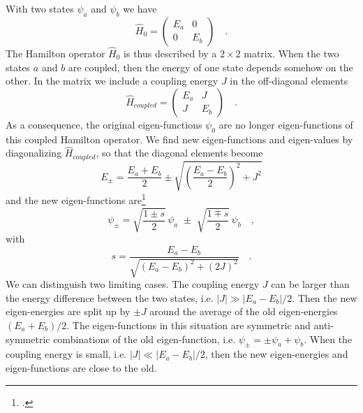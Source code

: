 With two states $\psi_a$ and $\psi_b$ we have
\begin{equation}
\hat{H}_0  = \begin{pmatrix}  E_a & 0 \\ 0 & E_b \end{pmatrix} 
	  \quad .
\end{equation}
The Hamilton operator $\hat{H}_0$ is thus described by a $2 \times 2$ matrix. When the two states $a$ and $b$ are coupled, then the energy of one state depends somehow on the other. In the matrix we include a coupling energy $J$ in the off-diagonal elements
\begin{equation}
\hat{H}_{coupled}  = \begin{pmatrix}  E_a & J \\ J & E_b \end{pmatrix} 
\quad . 
\end{equation}
As a consequence, the original eigen-functions $\psi_0$ are no longer eigen-functions of this coupled Hamilton operator. We find new eigen-functions and eigen-values by diagonalizing $\hat{H}_{coupled}$, so that the diagonal elements become
\begin{equation}
 E_\pm = \frac{E_a + E_b}{2} \pm \sqrt{ \left( \frac{E_a - E_b}{2} \right)^2 + J^2 }
\end{equation}
and the new  eigen-functions are\footcite[eq. 8.10]{Parson}
\begin{equation}
 \psi_{\pm} = 
\sqrt{\frac{1 \pm s}{2}} \,  \psi_a \, \,  \pm \, \, \sqrt{\frac{1 \mp s}{2}}  \, \psi_b \quad ,
\end{equation}
with
\begin{equation}
s = \frac{E_a - E_b}{\sqrt{(E_a - E_b)^2 + (2J)^2}} \quad .
\end{equation}
%
We can distinguish two limiting cases. The coupling energy $J$ can be larger than the energy difference between the two states, i.e. $|J| \gg |E_a - E_b| / 2$. Then the new eigen-energies are split up by $\pm J$ around the average of the old eigen-energies $(E_a + E_b) /2$. The eigen-functions in this situation are symmetric and anti-symmetric combinations of the old eigen-function, i.e. $\psi_\pm = \pm \psi_a + \psi_b$. When the coupling energy is small, i.e. $|J| \ll |E_a - E_b| / 2$, then the new eigen-energies and eigen-functions are close to the old.



